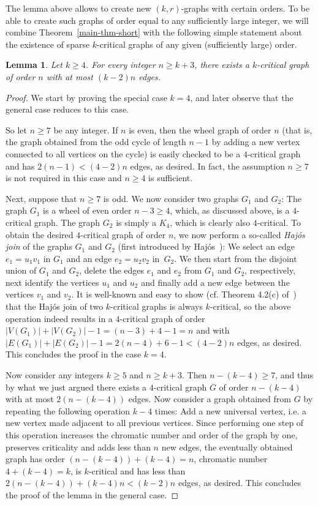 \documentclass[a4paper,10pt,hidelinks]{amsart}
\newtheorem{lemma}[theorem]{Lemma}
\theoremstyle{definition}
\begin{document}
The lemma above allows to create new $(k,r)$-graphs with certain orders. To be able to create such graphs of order equal to any sufficiently large integer, we will combine Theorem~\ref{main-thm-short} with the following simple statement about the existence of sparse $k$-critical graphs of any given (sufficiently large) order. 

\begin{lemma}\label{lem:critorder}
Let $k\ge 4$. For every integer $n\ge k+3$, there exists a $k$-critical graph of order $n$ with at most $(k-2)n$ edges. 
\end{lemma}
\begin{proof}
We start by proving the special case $k=4$, and later observe that the general case reduces to this case. 

So let $n\ge 7$ be any integer. If $n$ is even, then the wheel graph of order $n$ (that is, the graph obtained from the odd cycle of length $n-1$ by adding a new vertex connected to all vertices on the cycle) is easily checked to be a $4$-critical graph and has $2(n-1)<(4-2)n$ edges, as desired. In fact, the assumption $n\ge 7$ is not required in this case and $n\ge 4$ is sufficient. 

Next, suppose that $n\ge 7$ is odd. We now consider two graphs $G_1$ and $G_2$: The graph $G_1$ is a wheel of even order $n-3\ge 4$, which, as discussed above, is a $4$-critical graph. The graph $G_2$ is simply a $K_4$, which is clearly also $4$-critical. To obtain the desired $4$-critical graph of order $n$, we now perform a so-called \emph{Haj\'{o}s join} of the graphs $G_1$ and $G_2$ (first introduced by Haj\'{o}s~\cite{hajos}): We select an edge $e_1=u_1v_1$ in $G_1$ and an edge $e_2=u_2v_2$ in~$G_2$. We then start from the disjoint union of $G_1$ and $G_2$, delete the edges $e_1$ and $e_2$ from $G_1$ and $G_2$, respectively, next identify the vertices $u_1$ and $u_2$ and finally add a new edge between the vertices $v_1$ and $v_2$. It is well-known and easy to show (cf. Theorem 4.2(c) of~\cite{stiebitz}) that the Haj\'{o}s join of two $k$-critical graphs is always $k$-critical, so the above operation indeed results in a $4$-critical graph of order $|V(G_1)|+|V(G_2)|-1=(n-3)+4-1=n$ and with $|E(G_1)|+|E(G_2)|-1=2(n-4)+6-1<(4-2)n$ edges, as desired. This concludes the proof in the case $k=4$. 

Now consider any integers $k\ge 5$ and $n\ge k+3$. Then $n-(k-4)\ge 7$, and thus by what we just argued there exists a $4$-critical graph $G$ of order $n-(k-4)$ with at most $2(n-(k-4))$ edges. Now consider a graph obtained from $G$ by repeating the following operation $k-4$ times: Add a new universal vertex, i.e. a new vertex made adjacent to all previous vertices. Since performing one step of this operation increases the chromatic number and order of the graph by one, preserves criticality and adds less than $n$ new edges, the eventually obtained graph has order $(n-(k-4))+(k-4)=n$, chromatic number $4+(k-4)=k$, is $k$-critical and has less than $2(n-(k-4))+(k-4)n<(k-2)n$ edges, as desired. This concludes the proof of the lemma in the general case.
\end{proof}
\end{document}
